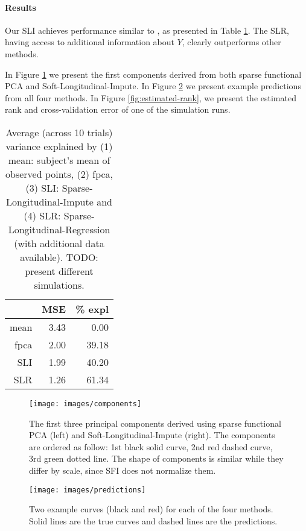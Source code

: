\documentclass[preprint]{imsart}
\numberwithin{equation}{section}
\theoremstyle{plain}
\begin{document}
\paragraph{Results}

Our SLI achieves performance similar to \citep{james2000principal}, as presented in Table \ref{tbl:simulations}. The SLR, having access to additional information about $Y$, clearly outperforms other methods.

In Figure \ref{fig:principal-components} we present the first components derived from both sparse functional PCA and Soft-Longitudinal-Impute. In Figure \ref{fig:example-predictions} we present example predictions from all four methods. In Figure \ref{fig:estimated-rank}, we present the estimated rank and cross-validation error of one of the simulation runs.

\begin{table}[ht]
\centering
\begin{tabular}{rrr}
  \hline
 & MSE & \% expl \\ 
  \hline
  mean & 3.43 & 0.00 \\ 
  fpca & 2.00 & 39.18 \\ 
  SLI & 1.99 & 40.20 \\ 
  SLR & 1.26 & 61.34 \\ 
   \hline
\end{tabular}\label{tbl:simulations}
\caption{Average (across 10 trials) variance explained by (1) mean: subject's mean of observed points, (2) fpca, (3) SLI: Sparse-Longitudinal-Impute and (4) SLR: Sparse-Longitudinal-Regression (with additional data available). TODO: present different simulations.}
\end{table}

\begin{figure}[h!]
  \texttt{[image: images/components]}
  \caption{The first three principal components derived using sparse functional PCA (left) and Soft-Longitudinal-Impute (right). The components are ordered as follow: 1st black solid curve, 2nd red dashed curve, 3rd green dotted line. The shape of components is similar while they differ by scale, since SFI does not normalize them.}
  \label{fig:principal-components}
\end{figure}

\begin{figure}[h!]
  \texttt{[image: images/predictions]}
  \caption{Two example curves (black and red) for each of the four methods. Solid lines are the true curves and dashed lines are the predictions. }
  \label{fig:example-predictions}
\end{figure}
\end{document}
